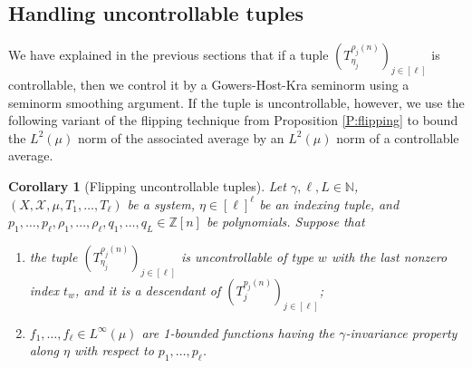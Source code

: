 \documentclass[11pt]{amsart}
\newtheorem{corollary}[lemma]{Corollary}
\theoremstyle{definition}
\newcommand{\N}{{\mathbb N}}
\newcommand{\Z}{{\mathbb Z}}
\newcommand{\CX}{{\mathcal X}}
\newcommand{\brac}[1]{\mathopen{}\left( #1 \mathclose{}\right)}
\begin{document}
\subsection{Handling uncontrollable tuples}\label{SS:uncontrollable}
We have explained in the previous sections that if a tuple $\brac{T_{\eta_j}^{\rho_j(n)}}_{j\in[\ell]}$ is controllable, then we control it by a Gowers-Host-Kra seminorm using a seminorm smoothing argument. If the tuple is uncontrollable, however, we use the following variant of the flipping technique from Proposition \ref{P:flipping} to bound the $L^2(\mu)$ norm of the associated average by an $L^2(\mu)$ norm of a controllable average.
\begin{corollary}[Flipping uncontrollable tuples]\label{C: Flipping uncontrollable tuples}
Let $\gamma, \ell, L\in\N$, $(X, \CX, \mu, T_1, \ldots, T_\ell)$ be a system, $\eta\in[\ell]^\ell$ be an indexing tuple, and $p_1, \ldots, p_\ell, \rho_1, \ldots, \rho_\ell, q_1, \ldots, q_L\in\Z[n]$ be polynomials. Suppose that
\begin{enumerate}
    \item the tuple $\brac{T_{\eta_j}^{\rho_j(n)}}_{j\in[\ell]}$ is uncontrollable of type $w$ with the last nonzero index $t_w$, and it is a descendant of $\brac{T_j^{p_j(n)}}_{j\in[\ell]}$;
    \item $f_1, \ldots, f_{\ell}\in L^\infty(\mu)$ are 1-bounded functions having the $\gamma$-invariance property along $\eta$ with respect to $p_1, \ldots, p_\ell$.
\end{enumerate}


\end{corollary}
\end{document}
